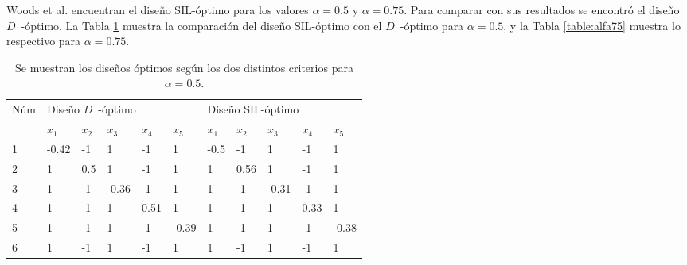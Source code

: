 Woods et al. encuentran el diseño SIL-óptimo para los valores ${\alpha = 0.5}$ y ${\alpha = 0.75}$. Para comparar con sus resultados se encontró el diseño $D$~-óptimo.
La Tabla \ref{table:alfa5} muestra la comparación del diseño SIL-óptimo con el $D$~-óptimo para $\alpha = 0.5$, y la Tabla \ref{table:alfa75} muestra lo respectivo para $\alpha = 0.75$.


\begin{table}[h]
\small
\centering
\begin{tabular}{l|lllll|lllll}
\multirow{2}{*}{Núm} & \multicolumn{5}{l|}{ \hspace{1.2cm} Diseño $D$~-óptimo} & \multicolumn{5}{l}{  \hspace{1cm}  Diseño SIL-óptimo}  \\
                     & $x_1$  & $x_2$ & $x_3$ & $x_4$ & $x_5$ & $x_1$ & $x_2$ & $x_3$ & $x_4$ & $x_5$  \\ \hline
1                    & -0.42  & -1    & 1     & -1    & 1     & -0.5  & -1    & 1     & -1    & 1      \\
2                    & 1      & 0.5  & 1     & -1    & 1     & 1     & 0.56  & 1     & -1    & 1      \\
3                    & 1      & -1    & -0.36  & -1    & 1     & 1     & -1    & -0.31 & -1    & 1      \\
4                    & 1      & -1    & 1     & 0.51  & 1     & 1     & -1    & 1     & 0.33  & 1      \\
5                    & 1      & -1    & 1     & -1    & -0.39 & 1     & -1    & 1     & -1    & -0.38 \\
6                    & 1      & -1    & 1     & -1    & 1     & 1     & -1    & 1     & -1    & 1     
\end{tabular}
\caption{Se muestran los diseños óptimos según los dos distintos criterios para $\alpha = 0.5$.}
\label{table:alfa5}
\end{table}



